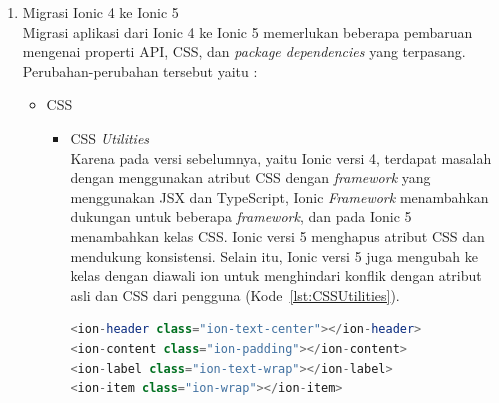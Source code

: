 \begin{enumerate}
\begin{enumerate}
\begin{itemize}
\begin{itemize}
				\item Navbar \\
				Pada Ionic 4, terdapat penghapusan terhadap komponen <ion-navbar> karena untuk menjaga agar selalu menggunakan <ion-toolbar> dengan {\it back button} yang eksplisit~\ref{lst:navbarIonic4}.
				\begin{lstlisting}[language=php, label={lst:navbarIonic4}, caption=Penggunaan Navbar pada Ionic 4 dengan {\it Back Button}]
<ion-toolbar>
	<ion-buttons slot="start">
		<ion-back-button></ion-back-button>
	</ion-buttons>
	<ion-title>My Navigation Bar</ion-title>
</ion-toolbar>
				\end{lstlisting}
			\end{itemize}
			Selain yang telah disebutkan, terdapat beberapa perubahan lainnya yang tidak ditulis seperti Action Sheet, Alert, Colors, Content, Datetime, Dynamic Mode, Fixed Content, Grid, Icon, Infinite Scroll, Item, Item Divider, Item Options, Item Sliding, List Header, Loading, Modal, Option, Overlays, Popover, Radio, Range, Refresher, Scroll, Segment Button, Select, Show When, Hide When, Spinner, Tabs, Typography, Therming, Toast, dan Toolbar~\footnote{\textit{`Breaking Changes'} https://github.com/ionic-team/ionic-framework/blob/main/angular/BREAKING.md, Diakses pada 13 November 2021. \label{ref:breakingChanges}}.
		\end{itemize}


	\end{enumerate}

\newpage
	\item Migrasi Ionic 4 ke Ionic 5 \\
	Migrasi aplikasi dari Ionic 4 ke Ionic 5 memerlukan beberapa pembaruan mengenai properti API, CSS, dan {\it package dependencies} yang terpasang. Perubahan-perubahan tersebut yaitu :

	\begin{itemize}
		\item CSS
		\begin{itemize}
			\item CSS {\it Utilities} \\
			Karena pada versi sebelumnya, yaitu Ionic versi 4, terdapat masalah dengan menggunakan atribut CSS dengan {\it framework} yang menggunakan JSX dan TypeScript, Ionic {\it Framework} menambahkan dukungan untuk beberapa {\it framework}, dan pada Ionic 5 menambahkan kelas CSS. Ionic versi 5 menghapus atribut CSS dan mendukung konsistensi. Selain itu, Ionic versi 5 juga mengubah ke kelas dengan diawali ion untuk menghindari konflik dengan atribut asli dan CSS dari pengguna (Kode~\ref{lst:CSSUtilities}).
		\begin{lstlisting}[language=php, label={lst:CSSUtilities}, caption=Contoh Kode Kelas CSS {\it Utility} pada Ionic 5]
<ion-header class="ion-text-center"></ion-header>
<ion-content class="ion-padding"></ion-content>
<ion-label class="ion-text-wrap"></ion-label>
<ion-item class="ion-wrap"></ion-item>
		\end{lstlisting} 
  

\end{itemize}
\end{itemize}
\end{enumerate}
